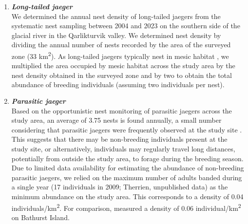 \documentclass[a4paper,twoside,12pt]{article}
\begin{document}
\begin{enumerate}[label=\alph*.]
                \item[] \textit{\textbf{Long-tailed jaeger}}\\
                We determined the annual nest density of long-tailed jaegers from the systematic nest sampling between 2004 and 2023 on the southern side of the glacial river in the Qarlikturvik valley. We determined nest density by dividing the annual number of nests recorded by the area of the surveyed zone (33 km\textsuperscript{2}). As long-tailed jaegers typically nest in mesic habitat \citep{andersson1971}, we multiplied the area occupied by mesic habitat across the study area by the nest density obtained in the surveyed zone and by two to obtain the total abundance of breeding individuals (assuming two individuals per nest).
                
                \item[] \textit{\textbf{Parasitic jaeger}}\\
                Based on the opportunistic nest monitoring of parasitic jaegers across the study area, an average of 3.75 nests is found annually, a small number considering that parasitic jaegers were frequently observed at the study site \citep{gauthier2024a}. This suggests that there may be non-breeding individuals present at the study site, or alternatively, individuals may regularly travel long distances, potentially from outside the study area, to forage during the breeding season. Due to limited data availability for estimating the abundance of non-breeding parasitic jaegers, we relied on the maximum number of adults banded during a single year (17 individuals in 2009; Therrien, unpublished data) as the minimum abundance on the study area. This corresponds to a density of 0.04 individuals/km\textsuperscript{2}. For comparison, \citet{taylor1974} measured a density of 0.06 individual/km\textsuperscript{2} on Bathurst Island.
                

\end{enumerate}
\end{document}

